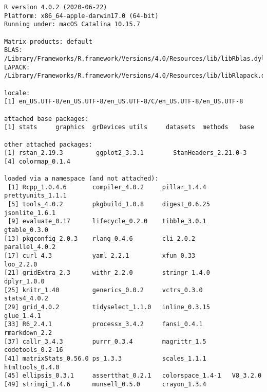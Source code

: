 \documentclass[
  letterpaper,
  DIV=11,
  numbers=noendperiod]{scrartcl}
\begin{document}
\begin{verbatim}
R version 4.0.2 (2020-06-22)
Platform: x86_64-apple-darwin17.0 (64-bit)
Running under: macOS Catalina 10.15.7

Matrix products: default
BLAS:   /Library/Frameworks/R.framework/Versions/4.0/Resources/lib/libRblas.dylib
LAPACK: /Library/Frameworks/R.framework/Versions/4.0/Resources/lib/libRlapack.dylib

locale:
[1] en_US.UTF-8/en_US.UTF-8/en_US.UTF-8/C/en_US.UTF-8/en_US.UTF-8

attached base packages:
[1] stats     graphics  grDevices utils     datasets  methods   base     

other attached packages:
[1] rstan_2.19.3         ggplot2_3.3.1        StanHeaders_2.21.0-3
[4] colormap_0.1.4      

loaded via a namespace (and not attached):
 [1] Rcpp_1.0.4.6       compiler_4.0.2     pillar_1.4.4       prettyunits_1.1.1 
 [5] tools_4.0.2        pkgbuild_1.0.8     digest_0.6.25      jsonlite_1.6.1    
 [9] evaluate_0.17      lifecycle_0.2.0    tibble_3.0.1       gtable_0.3.0      
[13] pkgconfig_2.0.3    rlang_0.4.6        cli_2.0.2          parallel_4.0.2    
[17] curl_4.3           yaml_2.2.1         xfun_0.33          loo_2.2.0         
[21] gridExtra_2.3      withr_2.2.0        stringr_1.4.0      dplyr_1.0.0       
[25] knitr_1.40         generics_0.0.2     vctrs_0.3.0        stats4_4.0.2      
[29] grid_4.0.2         tidyselect_1.1.0   inline_0.3.15      glue_1.4.1        
[33] R6_2.4.1           processx_3.4.2     fansi_0.4.1        rmarkdown_2.2     
[37] callr_3.4.3        purrr_0.3.4        magrittr_1.5       codetools_0.2-16  
[41] matrixStats_0.56.0 ps_1.3.3           scales_1.1.1       htmltools_0.4.0   
[45] ellipsis_0.3.1     assertthat_0.2.1   colorspace_1.4-1   V8_3.2.0          
[49] stringi_1.4.6      munsell_0.5.0      crayon_1.3.4      
\end{verbatim}
\end{document}
